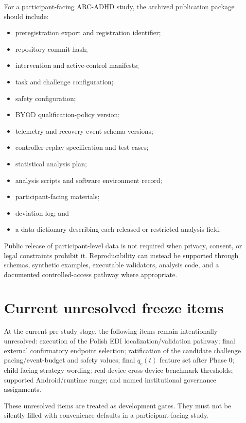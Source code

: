 \documentclass[man]{apa7}
\begin{document}
For a participant-facing ARC-ADHD study, the archived publication package should include:

\begin{itemize}
\item preregistration export and registration identifier;
\item repository commit hash;
\item intervention and active-control manifests;
\item task and challenge configuration;
\item safety configuration;
\item BYOD qualification-policy version;
\item telemetry and recovery-event schema versions;
\item controller replay specification and test cases;
\item statistical analysis plan;
\item analysis scripts and software environment record;
\item participant-facing materials;
\item deviation log; and
\item a data dictionary describing each released or restricted analysis field.
\end{itemize}

Public release of participant-level data is not required when privacy, consent, or legal constraints prohibit it. Reproducibility can instead be supported through schemas, synthetic examples, executable validators, analysis code, and a documented controlled-access pathway where appropriate.

\section{Current unresolved freeze items}

At the current pre-study stage, the following items remain intentionally unresolved: execution of the Polish EDI localization/validation pathway; final external confirmatory endpoint selection; ratification of the candidate challenge pacing/event-budget and safety values; final \(q_e(t)\) feature set after Phase 0; child-facing strategy wording; real-device cross-device benchmark thresholds; supported Android/runtime range; and named institutional governance assignments.

These unresolved items are treated as development gates. They must not be silently filled with convenience defaults in a participant-facing study.

\printbibliography[title={References}]
\end{document}
